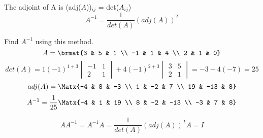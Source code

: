 \begin{definition}
The adjoint of A is (adj($A$))$_{ij}$ = det($A_{ij}$)
\[ A^{-1}=\frac{1}{det(A)}\left(adj(A)\right)^T \]
\end{definition}
\begin{example}
Find $A^{-1}$ using this method.
\[ A = \brmat{3 & 5 & 1 \\  -1 & 1 & 4 \\ 2 & 1 & 0} \]
\[ det(A)=1(-1)^{1+3}\begin{vmatrix}-1 & 1 \\ 2 & 1 \end{vmatrix}
 + 4(-1)^{2+3}\begin{vmatrix}3 & 5 \\ 2 & 1\end{vmatrix}
  = -3 - 4(-7) = 25\]
\[ adj(A) = \Matx{-4 & 8 & -3 \\ 1 & -2 & 7 \\ 19 & -13 & 8} \]
\[ A^{-1} = \frac{1}{25}\Matx{-4 & 1 & 19 \\ 8 & -2 & -13 \\ -3 & 7 & 8}\]
\end{example}
\begin{definition}
\[ AA^{-1} =A^{-1}A = \frac{1}{det(A)}\left(adj(A)\right)^TA = I \] 
\end{definition}


